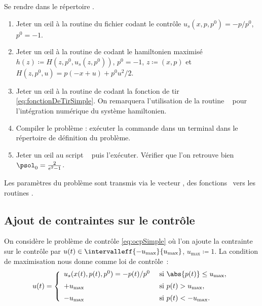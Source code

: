 \begin{myExercice} Se rendre dans le r\'epertoire .
    \begin{enumerate}
        \item Jeter un \oe il \`a la routine  du fichier  codant le contr\^ole $u_s(x,p,p^0) = -p/p^0$, $p^0=-1$.
        \item Jeter un \oe il \`a la routine  de  codant le hamiltonien maximis\'e 
            $h(z) \coloneqq H(z, p^0, u_s(z, p^0))$, $p^0=-1$, $z\coloneqq (x,p)$ et $H(z,p^0,u) = p(-x+u)+p^0 u^2/2$.
        \item Jeter un \oe il \`a la routine  de  codant la fonction de tir \eqref{eq:fonctionDeTirSimple}.
            On remarquera l'utilisation de la routine \fortran\  pour l'int\'egration num\'erique du syst\`eme hamiltonien.
        \item Compiler le probl\`eme : ex\'ecuter la commande  dans un terminal dans le r\'epertoire de d\'efinition du probl\`eme.
        \item Jeter un \oe il au script \matlab\  puis l'ex\'ecuter. V\'erifier que l'on retrouve bien $\psol_0 = \frac{2}{e^2-1}$.
    \end{enumerate}
\end{myExercice}

\begin{myremark}
    \anoter
    Les param\`etres du probl\`eme sont transmis via le vecteur , des fonctions \matlab\ vers les routines \fortran.
\end{myremark}

\subsection{Ajout de contraintes sur le contr\^ole}

On consid\`ere le probl\`eme de contr\^ole \eqref{eq:ocpSimple} o\`u l'on ajoute la contrainte sur le contr\^ole par
$u(t) \in \intervalleff{-u_\mathrm{max}}{u_\mathrm{max}}$, $u_\mathrm{max}\coloneqq 1$. La condition de maximisation nous donne comme loi de contr\^ole~:
\begin{equation*}
    u(t) = 
    \left\{
        \begin{array}{ll}
            u_s(x(t),p(t),p^0) = -p(t)/p^0   & \text{ si } \abs{p(t)} \le u_\mathrm{max}, \\[0.5em]
            +u_\mathrm{max}         & \text{ si } p(t) > u_\mathrm{max}, \\[0.5em]
            -u_\mathrm{max}         & \text{ si } p(t) < -u_\mathrm{max}.
        \end{array}
    \right.
\end{equation*}

